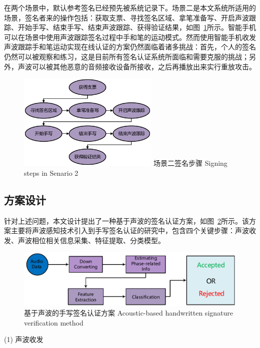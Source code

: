 在两个场景中，默认参考签名已经预先被系统记录下。场景二是本文系统所适用的场景，签名者来的操作包括：获取支票、寻找签名区域、拿笔准备写、开启声波跟踪、开始手写、结束手写、结束声波跟踪、获得验证结果，如图~\ref{fig:signing-steps}所示。智能手机可以在场景中使用声波跟踪签名过程中手和笔的运动模式。然而使用智能手机收发声波跟踪手和笔运动实现在线认证的方案仍然面临着诸多挑战：首先，个人的签名仍然可以被观察和练习，这是目前所有签名认证系统所面临和需要克服的挑战；另外，声波可以被其他恶意的音频接收设备所接收，之后再播放出来实行重放攻击。
\begin{figure}[!htp]
  \centering
  \includegraphics[width=0.6\textwidth]{figure/senario-actions}
  \bicaption
    {场景二签名步骤}
    {Signing steps in Senario 2}
  \label{fig:signing-steps}
\end{figure}

\subsection{方案设计}
针对上述问题，本文设计提出了一种基于声波的签名认证方案，如图~\ref{fig:acoustic-hsv-method}所示。该方案主要将声波感知技术引入到手写签名认证的研究中，包含四个关键步骤：声波收发、声波相位相关信息采集、特征提取、分类模型。
\begin{figure}[!htp]
  \centering
  \includegraphics[width=\textwidth]{figure/system-architecture.pdf}
  \bicaption
    {基于声波的手写签名认证方案}
    {Acoustic-based handwritten signature verification method}
  \label{fig:acoustic-hsv-method}
\end{figure}

(1) 声波收发

